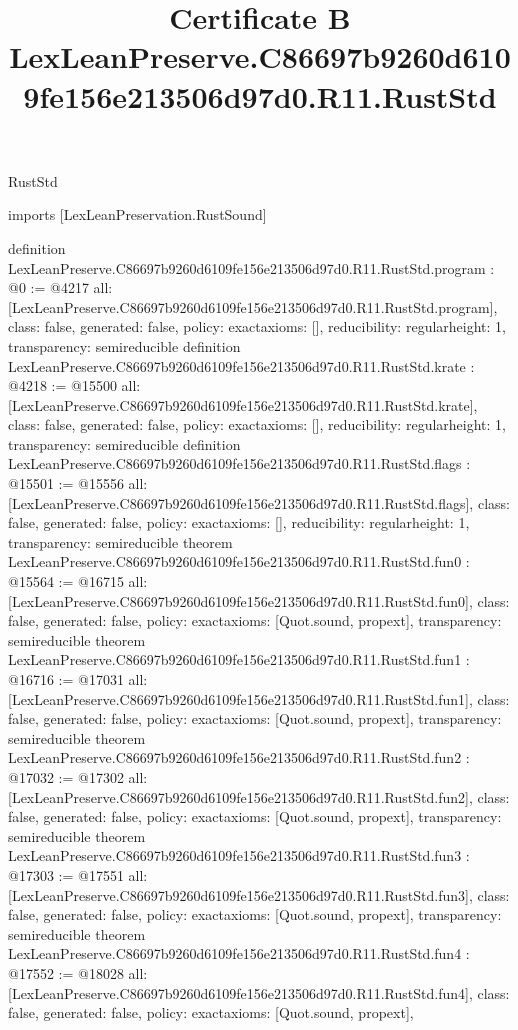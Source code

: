 \begin{lexlean}{RustStd}
\title{Certificate B LexLeanPreserve.C86697b9260d6109fe156e213506d97d0.R11.RustStd}
\begin{coremodule}
imports [LexLeanPreservation.RustSound]

definition LexLeanPreserve.C86697b9260d6109fe156e213506d97d0.R11.RustStd.program : @0 := @4217 {
  all: [LexLeanPreserve.C86697b9260d6109fe156e213506d97d0.R11.RustStd.program],
  class: false,
  generated: false,
  policy: exact{axioms: []},
  reducibility: regular{height: 1},
  transparency: semireducible
}
definition LexLeanPreserve.C86697b9260d6109fe156e213506d97d0.R11.RustStd.krate : @4218 := @15500 {
  all: [LexLeanPreserve.C86697b9260d6109fe156e213506d97d0.R11.RustStd.krate],
  class: false,
  generated: false,
  policy: exact{axioms: []},
  reducibility: regular{height: 1},
  transparency: semireducible
}
definition LexLeanPreserve.C86697b9260d6109fe156e213506d97d0.R11.RustStd.flags : @15501 := @15556 {
  all: [LexLeanPreserve.C86697b9260d6109fe156e213506d97d0.R11.RustStd.flags],
  class: false,
  generated: false,
  policy: exact{axioms: []},
  reducibility: regular{height: 1},
  transparency: semireducible
}
theorem LexLeanPreserve.C86697b9260d6109fe156e213506d97d0.R11.RustStd.fun0 : @15564 := @16715 {
  all: [LexLeanPreserve.C86697b9260d6109fe156e213506d97d0.R11.RustStd.fun0],
  class: false,
  generated: false,
  policy: exact{axioms: [Quot.sound, propext]},
  transparency: semireducible
}
theorem LexLeanPreserve.C86697b9260d6109fe156e213506d97d0.R11.RustStd.fun1 : @16716 := @17031 {
  all: [LexLeanPreserve.C86697b9260d6109fe156e213506d97d0.R11.RustStd.fun1],
  class: false,
  generated: false,
  policy: exact{axioms: [Quot.sound, propext]},
  transparency: semireducible
}
theorem LexLeanPreserve.C86697b9260d6109fe156e213506d97d0.R11.RustStd.fun2 : @17032 := @17302 {
  all: [LexLeanPreserve.C86697b9260d6109fe156e213506d97d0.R11.RustStd.fun2],
  class: false,
  generated: false,
  policy: exact{axioms: [Quot.sound, propext]},
  transparency: semireducible
}
theorem LexLeanPreserve.C86697b9260d6109fe156e213506d97d0.R11.RustStd.fun3 : @17303 := @17551 {
  all: [LexLeanPreserve.C86697b9260d6109fe156e213506d97d0.R11.RustStd.fun3],
  class: false,
  generated: false,
  policy: exact{axioms: [Quot.sound, propext]},
  transparency: semireducible
}
theorem LexLeanPreserve.C86697b9260d6109fe156e213506d97d0.R11.RustStd.fun4 : @17552 := @18028 {
  all: [LexLeanPreserve.C86697b9260d6109fe156e213506d97d0.R11.RustStd.fun4],
  class: false,
  generated: false,
  policy: exact{axioms: [Quot.sound, propext]},
}
\end{coremodule}
\end{lexlean}
